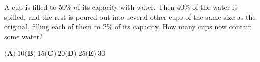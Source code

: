 A cup is filled to $50\%$ of its capacity with water. Then $40\%$ of the water is spilled, and the rest is poured out into several other cups of the same size as the original, filling each of them to $2\%$ of its capacity. How many cups now contain some water?

$\textbf{(A)}\ 10$\qquad$\textbf{(B)}\ 15$\qquad$\textbf{(C)}\ 20$\qquad$\textbf{(D)}\ 25$\qquad$\textbf{(E)}\ 30$
